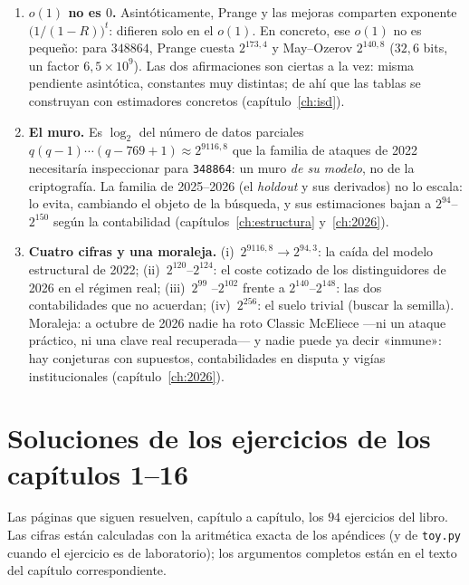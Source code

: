 \documentclass[11pt,a4paper,oneside]{report}
\begin{document}
\begin{enumerate}[leftmargin=1.9em,itemsep=5pt]
  \item \textbf{$o(1)$ no es $0$.} Asintóticamente, Prange y las
        mejoras comparten exponente $\bigl(1/(1-R)\bigr)^{t}$:
        difieren solo en el $o(1)$. En concreto, ese $o(1)$ no
        es pequeño: para $348864$, Prange cuesta $2^{173{,}4}$ y
        May--Ozerov $2^{140{,}8}$ ($32{,}6$ bits, un factor
        $6{,}5\times10^{9}$). Las dos afirmaciones son ciertas a la vez:
        misma pendiente asintótica, constantes muy distintas; de
        ahí que las tablas se construyan con estimadores concretos
        (capítulo~\ref{ch:isd}).

  \item \textbf{El muro.} Es $\log_2$ del número de datos
        parciales $q(q-1)\cdots(q-769+1)\approx2^{9116{,}8}$ que
        la familia de ataques de 2022 necesitaría inspeccionar
        para \texttt{348864}: un muro \emph{de su modelo}, no de
        la criptografía. La familia de 2025--2026 (el
        \emph{holdout} y sus derivados) no lo escala: lo evita,
        cambiando el objeto de la búsqueda, y sus estimaciones
        bajan a $2^{94}$--$2^{150}$ según la contabilidad
        (capítulos~\ref{ch:estructura} y~\ref{ch:2026}).

  \item \textbf{Cuatro cifras y una moraleja.} (i)~$2^{9116{,}8}\to
        2^{94{,}3}$: la caída del modelo estructural de 2022;
        (ii)~$2^{120}$--$2^{124}$: el coste cotizado de los
        distinguidores de 2026 en el régimen real; (iii)~$2^{99}$
        --$2^{102}$ frente a $2^{140}$--$2^{148}$: las dos
        contabilidades que no acuerdan; (iv)~$2^{256}$: el suelo
        trivial (buscar la semilla). Moraleja: a octubre de 2026
        nadie ha roto Classic McEliece ---ni un ataque práctico,
        ni una clave real recuperada--- y nadie puede ya decir
        «inmune»: hay conjeturas con supuestos, contabilidades en
        disputa y vigías institucionales (capítulo~\ref{ch:2026}).
\end{enumerate}

\section{Soluciones de los ejercicios de los capítulos 1--16}
\label{sec:sol-ejercicios}

Las páginas que siguen resuelven, capítulo a capítulo, los $94$
ejercicios del libro. Las cifras están calculadas con la aritmética
exacta de los apéndices (y de \texttt{toy.py} cuando el ejercicio es
de laboratorio); los argumentos completos están en el texto del
capítulo correspondiente.
\end{document}
